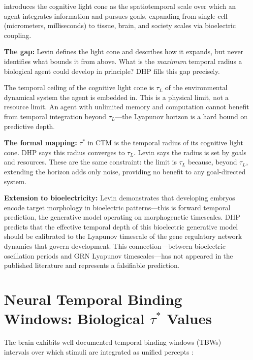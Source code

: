 \documentclass[12pt]{article}
\begin{document}
\citet{levin2019computational} introduces the cognitive light cone as the spatiotemporal
scale over which an agent integrates information and pursues goals, expanding from
single-cell (micrometers, milliseconds) to tissue, brain, and society scales via bioelectric
coupling.

\textbf{The gap:} Levin defines the light cone and describes how it expands, but never
identifies what bounds it from above. What is the \emph{maximum} temporal radius a
biological agent could develop in principle? DHP fills this gap precisely.

The temporal ceiling of the cognitive light cone is $\tau_L$ of the environmental dynamical
system the agent is embedded in. This is a physical limit, not a resource limit. An agent
with unlimited memory and computation cannot benefit from temporal integration beyond
$\tau_L$---the Lyapunov horizon is a hard bound on predictive depth.

\textbf{The formal mapping:} $\tau^*$ in CTM is the temporal radius of its cognitive light
cone. DHP says this radius converges to $\tau_L$. Levin says the radius is set by goals
and resources. These are the same constraint: the limit is $\tau_L$ because, beyond $\tau_L$,
extending the horizon adds only noise, providing no benefit to any goal-directed system.

\textbf{Extension to bioelectricity:} Levin demonstrates that developing embryos encode
target morphology in bioelectric patterns---this is forward temporal prediction, the
generative model operating on morphogenetic timescales. DHP predicts that the effective
temporal depth of this bioelectric generative model should be calibrated to the Lyapunov
timescale of the gene regulatory network dynamics that govern development. This
connection---between bioelectric oscillation periods and GRN Lyapunov timescales---has not
appeared in the published literature and represents a falsifiable prediction.

\section{Neural Temporal Binding Windows: Biological $\tau^*$ Values}
\label{sec:tbw}

The brain exhibits well-documented temporal binding windows (TBWs)---intervals over which
stimuli are integrated as unified percepts \citep{meredith1987determinants}:
\end{document}
